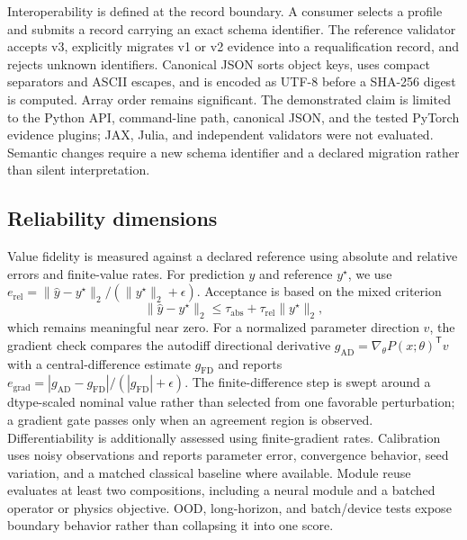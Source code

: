 \documentclass[preprint,12pt,authoryear]{elsarticle}
\begin{document}
Interoperability is defined at the record boundary. A consumer selects a profile and submits a record carrying an exact schema identifier. The reference validator accepts v3, explicitly migrates v1 or v2 evidence into a requalification record, and rejects unknown identifiers. Canonical JSON sorts object keys, uses compact separators and ASCII escapes, and is encoded as UTF-8 before a SHA-256 digest is computed. Array order remains significant. The demonstrated claim is limited to the Python API, command-line path, canonical JSON, and the tested PyTorch evidence plugins; JAX, Julia, and independent validators were not evaluated. Semantic changes require a new schema identifier and a declared migration rather than silent interpretation.

\subsection{Reliability dimensions}
Value fidelity is measured against a declared reference using absolute and relative errors and finite-value rates. For prediction $\hat y$ and reference $y^{\star}$, we use $e_{\mathrm{rel}}=\|\hat y-y^{\star}\|_2/(\|y^{\star}\|_2+\epsilon)$. Acceptance is based on the mixed criterion
\begin{equation}
  \|\hat y-y^{\star}\|_2 \leq
  \tau_{\mathrm{abs}}+\tau_{\mathrm{rel}}\|y^{\star}\|_2,
  \label{eq:mixed-gate}
\end{equation}
which remains meaningful near zero. For a normalized parameter direction $v$, the gradient check compares the autodiff directional derivative $g_{\mathrm{AD}}=\nabla_{\theta}P(x;\theta)^{\mathsf T}v$ with a central-difference estimate $g_{\mathrm{FD}}$ and reports $e_{\mathrm{grad}}=|g_{\mathrm{AD}}-g_{\mathrm{FD}}|/(|g_{\mathrm{FD}}|+\epsilon)$. The finite-difference step is swept around a dtype-scaled nominal value rather than selected from one favorable perturbation; a gradient gate passes only when an agreement region is observed. Differentiability is additionally assessed using finite-gradient rates. Calibration uses noisy observations and reports parameter error, convergence behavior, seed variation, and a matched classical baseline where available. Module reuse evaluates at least two compositions, including a neural module and a batched operator or physics objective. OOD, long-horizon, and batch/device tests expose boundary behavior rather than collapsing it into one score.
\end{document}
